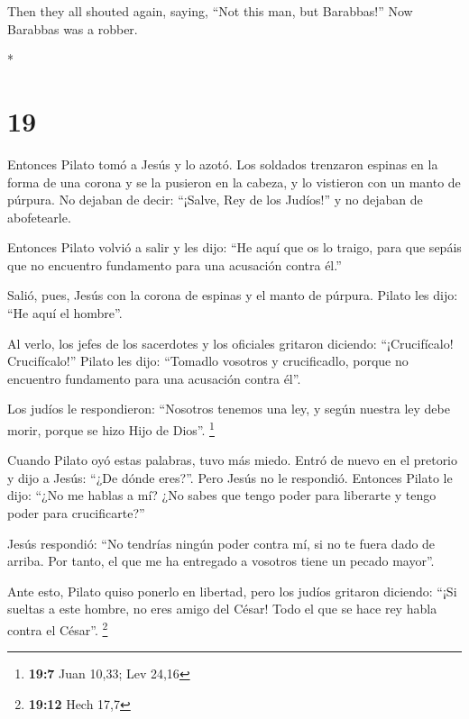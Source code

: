 \begin{paracol}{2}
\begin{otherlanguage}{english}
 Then they all shouted again, saying, ``Not this man, but
Barabbas!'' Now Barabbas was a robber.

\end{otherlanguage}

\switchcolumn[0]*

\hypertarget{section-36}{%
\section{19}\label{section-36}}

 Entonces Pilato tomó a Jesús y lo azotó. 
Los soldados trenzaron espinas en la forma de una corona y se la
pusieron en la cabeza, y lo vistieron con un manto de púrpura.
 No dejaban de decir: ``¡Salve, Rey de los Judíos!'' y no
dejaban de abofetearle.

 Entonces Pilato volvió a salir y les dijo: ``He aquí que
os lo traigo, para que sepáis que no encuentro fundamento para una
acusación contra él.''

 Salió, pues, Jesús con la corona de espinas y el manto de
púrpura. Pilato les dijo: ``He aquí el hombre''.

 Al verlo, los jefes de los sacerdotes y los oficiales
gritaron diciendo: ``¡Crucifícalo! Crucifícalo!'' Pilato les dijo:
``Tomadlo vosotros y crucificadlo, porque no encuentro fundamento para
una acusación contra él''.

 Los judíos le respondieron: ``Nosotros tenemos una ley, y
según nuestra ley debe morir, porque se hizo Hijo de Dios''. \footnote{\textbf{19:7}
  Juan 10,33; Lev 24,16}

 Cuando Pilato oyó estas palabras, tuvo más miedo.
 Entró de nuevo en el pretorio y dijo a Jesús: ``¿De dónde
eres?''. Pero Jesús no le respondió.  Entonces Pilato le
dijo: ``¿No me hablas a mí? ¿No sabes que tengo poder para liberarte y
tengo poder para crucificarte?''

 Jesús respondió: ``No tendrías ningún poder contra mí,
si no te fuera dado de arriba. Por tanto, el que me ha entregado a
vosotros tiene un pecado mayor''.

 Ante esto, Pilato quiso ponerlo en libertad, pero los
judíos gritaron diciendo: ``¡Si sueltas a este hombre, no eres amigo del
César! Todo el que se hace rey habla contra el César''. \footnote{\textbf{19:12}
  Hech 17,7}


\end{paracol}
